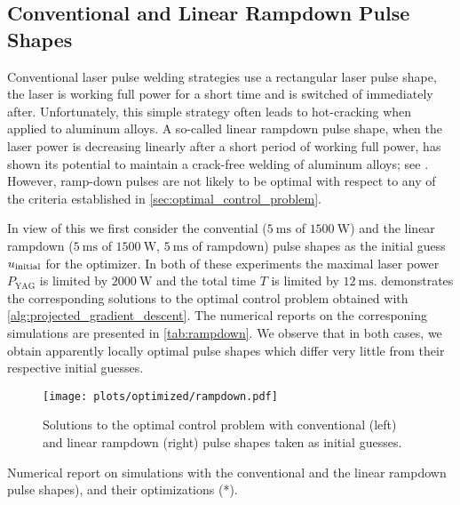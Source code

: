 \subsection{Conventional and Linear Rampdown Pulse Shapes}

Conventional laser pulse welding strategies use a rectangular laser pulse shape, \ie the laser is working full power for a short time and is switched of immediately after. 
Unfortunately, this simple strategy often leads to hot-cracking when applied to aluminum alloys.
A so-called linear rampdown pulse shape, \ie when the laser power is decreasing linearly after a short period of working full power, has shown its potential to maintain a crack-free welding of aluminum alloys; see \cite{JiaZhangYuShiLiuWuYeWangTian:2021:1}.
However, ramp-down pulses are not likely to be optimal with respect to any of the criteria established in \cref{sec:optimal_control_problem}.

In view of this we first consider the convential ($\SI{5}{\ms}$ of $\SI{1500}{\W}$) and the linear rampdown ($\SI{5}{\ms}$ of $\SI{1500}{\W}$, $\SI{5}{\ms}$ of rampdown) pulse shapes as the initial guess $u_\textup{initial}$ for the optimizer. In both of these experiments the maximal laser power $P_\text{YAG}$ is limited by $\SI{2000}{\W}$ and the total time $T$ is limited by $\SI{12}{\ms}$.
 demonstrates the corresponding solutions to the optimal control problem obtained with \cref{alg:projected_gradient_descent}.
The numerical reports on the corresponing simulations are presented in \cref{tab:rampdown}.
We observe that in both cases, we obtain apparently locally optimal pulse shapes which differ very little from their respective initial guesses.

\begin{figure} 
	\centering
	\texttt{[image: plots/optimized/rampdown.pdf]}
	\caption{Solutions to the optimal control problem with conventional (left) and linear rampdown (right) pulse shapes taken as initial guesses.}
	\label{fig:rampdown}
\end{figure}

\begin{table} 
	\centering
	
	\caption{Numerical report on simulations with the conventional and the linear rampdown pulse shapes), and their optimizations (*).}
	\label{tab:rampdown}
\end{table}



